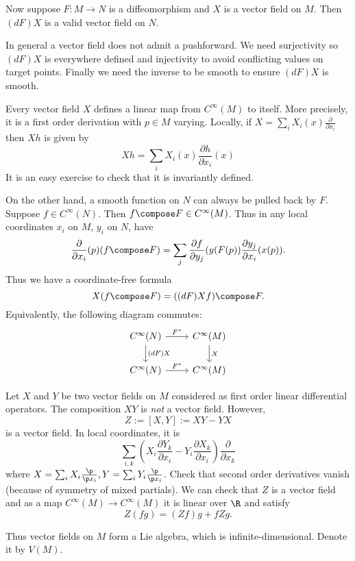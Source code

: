 \documentclass[a4paper]{article}
\begin{document}
Now suppose \(F: M \to N\) is a diffeomorphism and \(X\) is a vector field on \(M\). Then \((dF)X\) is a valid vector field on \(N\).

\begin{remark}
  In general a vector field does not admit a pushforward. We need surjectivity so \((dF)X\) is everywhere defined and injectivity to avoid conflicting values on target points. Finally we need the inverse to be smooth to ensure \((dF)X\) is smooth.
\end{remark}

Every vector field \(X\) defines a linear map from \(C^\infty(M)\) to itself. More precisely, it is a first order derivation with \(p \in M\) varying. Locally, if \(X = \sum_i X_i(x) \frac{\partial  }{\partial x_i}\) then \(Xh\) is given by
\[
  Xh = \sum_i X_i(x) \frac{\partial h}{\partial x_i}(x)
\]
It is an easy exercise to check that it is invariantly defined.

On the other hand, a smooth function on \(N\) can always be pulled back by \(F\). Suppose \(f \in C^\infty(N)\). Then \(f \compose F \in C^\infty(M)\). Thus in any local coordinates \(x_i\) on \(M\), \(y_i\) on \(N\), have
\[
  \frac{\partial  }{\partial x_i}(p) (f \compose F) = \sum_j \frac{\partial f}{\partial y_j} (y(F(p)) \frac{\partial y_j}{\partial x_i} (x(p)).
\]
Thus we have a coordinate-free formula
\[
  X(f \compose F) = ((dF)X f) \compose F.
\]
Equivalently, the following diagram commutes:
\[
  \begin{tikzcd}
    C^\infty(N) \ar[r, "F^*"] \ar[d, "(dF) X"] & C^\infty(M) \ar[d, "X"] \\
    C^\infty(N) \ar[r, "F^*"] & C^\infty(M)
  \end{tikzcd}
\]

Let \(X\) and \(Y\) be two vector fields on \(M\) considered as first order linear differential operators. The composition \(XY\) is \emph{not} a vector field. However,
\[
  Z := [X, Y] := XY - YX
\]
is a vector field. In local coordinates, it is
\[
  \sum_{i, k} \left( X_i \frac{\partial Y_k}{\partial x_i} - Y_i \frac{\partial X_k}{\partial x_i} \right) \frac{\partial  }{\partial x_k}
\]
where \(X = \sum_i X_i \frac{\p}{\p x_i}, Y = \sum_i Y_i \frac{\p}{\p x_i}\). Check that second order derivatives vanish (because of symmetry of mixed partials). We can check that \(Z\) is a vector field and as a map \(C^\infty(M) \to C^\infty(M)\) it is linear over \(\R\) and satisfy
\[
  Z(fg) = (Zf) g + f Zg.
\]

Thus vector fields on \(M\) form a Lie algebra, which is infinite-dimensional. Denote it by \(V(M)\).
\end{document}
